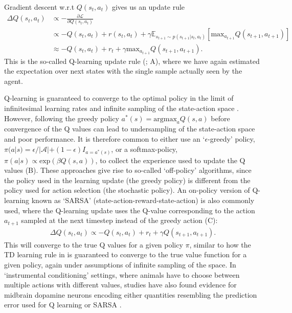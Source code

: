 Gradient descent w.r.t $Q(s_t,a_t)$ gives us an update rule
\begin{align}
    \Delta  Q(s_t,a_t) & \propto - \frac{\partial \mathcal{L}}{\partial  Q(s_t,a_t)}\\
    &\propto - Q(s_t,a_t) + r(s_t, a_t) + \gamma \mathbb{E}_{s_{t+1} \sim p(s_{t+1} | s_t, a_t)} \left [ \text{max}_{a_{t+1}} Q(s_{t+1}, a_{t+1}) \right ] \\
    &\approx - Q(s_t,a_t) + r_t + \gamma \text{max}_{a_{t+1}} Q(s_{t+1}, a_{t+1}).
\end{align}
This is the so-called Q-learning update rule (\citealp{watkins1989learning}; A), where we have again estimated the expectation over next states with the single sample actually seen by the agent.

Q-learning is guaranteed to converge to the optimal policy in the limit of infinitesimal learning rates and infinite sampling of the state-action space \citep{watkins1992q,sutton2018reinforcement}.
However, following the greedy policy $a^*(s) = \text{argmax}_{a} Q(s, a)$ before convergence of the Q values can lead to undersampling of the state-action space and poor performance.
It is therefore common to either use an `$\epsilon$-greedy' policy, $\pi(a|s) = \epsilon / |\mathcal{A}| + (1-\epsilon) I_{a = a^*(s)}$, or a softmax-policy, $\pi(a|s) \propto \text{exp}(\beta Q(s, a))$, to collect the experience used to update the Q values (B).
These approaches give rise to so-called `off-policy' algorithms, since the policy used in the learning update (the greedy policy) is different from the policy used for action selection (the stochastic policy).
An on-policy version of Q-learning known as `SARSA' (state-action-reward-state-action) is also commonly used, where the Q-learning update uses the Q-value corresponding to the action $a_{t+1}$ sampled at the next timestep instead of the greedy action (C):
\begin{align}
    \Delta  Q(s_t,a_t) \propto - Q(s_t,a_t) + r_t + \gamma Q(s_{t+1}, a_{t+1}).
\end{align}
This will converge to the true Q values for a given policy $\pi$, similar to how the TD learning rule in  is guaranteed to converge to the true value function for a given policy, again under assumptions of infinite sampling of the space.
In `instrumental conditioning' settings, where animals have to choose between multiple actions with different values, studies have also found evidence for midbrain dopamine neurons encoding either quantities resembling the prediction error used for Q learning \citep{roesch2007dopamine,niv2009reinforcement} or SARSA \citep{morris2006midbrain,niv2009reinforcement}.

